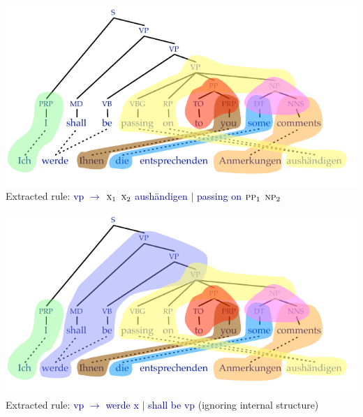 \documentclass[landscape]{slides}
\newcommand{\example}[1]{\textcolor{darkblue}{\rm #1}}
\begin{document}
\vspace{3mm}
\begin{center}
\includegraphics[scale=2.1]{minimal-rules7.pdf}\\[-1mm]
Extracted rule: \example{{\sc vp} $\rightarrow$ $\text{\sc x}_1$ $\text{\sc x}_2$ aush{\"a}ndigen $|$ passing on $\text{\sc pp}_1$ $\text{\sc np}_2$}
\end{center}


\vspace{3mm}
\begin{center}
\includegraphics[scale=2.1]{minimal-rules8.pdf}\\[-1mm]
Extracted rule: \example{{\sc vp} $\rightarrow$ werde  {\sc x} $|$ shall be {\sc vp}} (ignoring internal structure)
\end{center}

\end{document}
